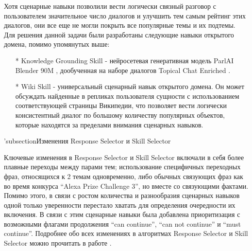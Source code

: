Хотя сценарные навыки позволили вести логически связный разговор с пользователем значительное число диалогов и улучшить тем самым рейтинг этих диалогов, они все еще не могли покрыть все популярные темы и их подтемы. Для решения данной задачи были разработаны следующие навыки открытого домена, помимо упомянутых выше:
\begin{itemize}
\item[*] Knowledge Grounding Skill - нейросетевая генеративная модель ParlAI Blender 90M \cite{roller_other_2020}, дообученная на наборе диалогов Topical Chat Enriched \cite{hedayatnia_2020}.
\item[*] Wiki Skill - универсальный сценарный навык открытого домена. Он может обсуждать найденные в репликах пользователя сущности с использованием соответствующей страницы Википедии, что позволяет вести логически консистентный диалог по большому количеству популярных объектов, которые находятся за пределами внимания сценарных навыков.
\end{itemize}
'subsection{Изменения Response Selector и Skill Selector}

Ключевые изменения в Response Selector и Skill Selector включали в себя более плавные переходы между парами тем; использование специфичных переходных фраз, относящихся к 2 темам одновременно, либо обычных связующих фраз как во время конкурса “Alexa Prize Challenge 3”, но вместе со связующими фактами. 
Помимо этого, в связи с ростом количества и разнообразия сценарных навыков одной только уверенности перестало хватать для определения очередности их включения. В связи с этим сценарные навыки была добавлена приоритизация с возможными флагами продолжения “can continue”, “can not continue” и “must continue”.
Подробнее обо всех изменениях в алгоритмах Response Selector и Skill Selector можно прочитать в работе \cite{baymurzina_2021}.

